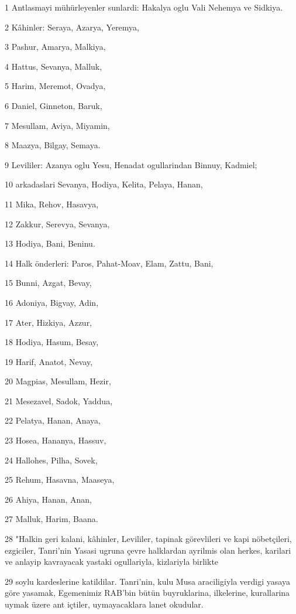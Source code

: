 \par 1 Antlasmayi mühürleyenler sunlardi: Hakalya oglu Vali Nehemya ve Sidkiya.
\par 2 Kâhinler: Seraya, Azarya, Yeremya,
\par 3 Pashur, Amarya, Malkiya,
\par 4 Hattus, Sevanya, Malluk,
\par 5 Harim, Meremot, Ovadya,
\par 6 Daniel, Ginneton, Baruk,
\par 7 Mesullam, Aviya, Miyamin,
\par 8 Maazya, Bilgay, Semaya.
\par 9 Levililer: Azanya oglu Yesu, Henadat ogullarindan Binnuy, Kadmiel;
\par 10 arkadaslari Sevanya, Hodiya, Kelita, Pelaya, Hanan,
\par 11 Mika, Rehov, Hasavya,
\par 12 Zakkur, Serevya, Sevanya,
\par 13 Hodiya, Bani, Beninu.
\par 14 Halk önderleri: Paros, Pahat-Moav, Elam, Zattu, Bani,
\par 15 Bunni, Azgat, Bevay,
\par 16 Adoniya, Bigvay, Adin,
\par 17 Ater, Hizkiya, Azzur,
\par 18 Hodiya, Hasum, Besay,
\par 19 Harif, Anatot, Nevay,
\par 20 Magpias, Mesullam, Hezir,
\par 21 Mesezavel, Sadok, Yaddua,
\par 22 Pelatya, Hanan, Anaya,
\par 23 Hosea, Hananya, Hassuv,
\par 24 Hallohes, Pilha, Sovek,
\par 25 Rehum, Hasavna, Maaseya,
\par 26 Ahiya, Hanan, Anan,
\par 27 Malluk, Harim, Baana.
\par 28 "Halkin geri kalani, kâhinler, Levililer, tapinak görevlileri ve kapi nöbetçileri, ezgiciler, Tanri'nin Yasasi ugruna çevre halklardan ayrilmis olan herkes, karilari ve anlayip kavrayacak yastaki ogullariyla, kizlariyla birlikte
\par 29 soylu kardeslerine katildilar. Tanri'nin, kulu Musa araciligiyla verdigi yasaya göre yasamak, Egemenimiz RAB'bin bütün buyruklarina, ilkelerine, kurallarina uymak üzere ant içtiler, uymayacaklara lanet okudular.
